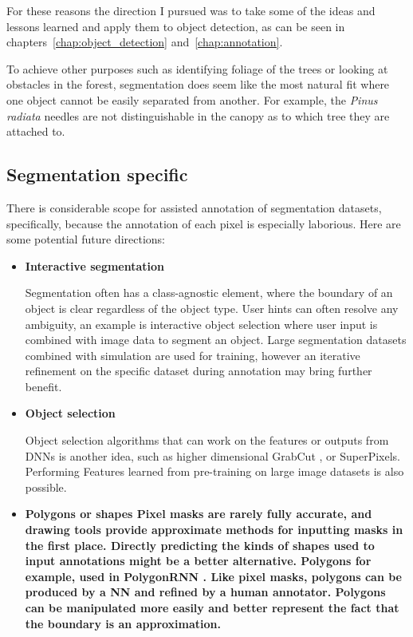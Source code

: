 For these reasons the direction I pursued was to take some of the ideas and lessons learned and apply them to object detection, as can be seen in chapters~\ref {chap:object_detection} and~\ref {chap:annotation}.

To achieve other purposes such as identifying foliage of the trees or looking at obstacles in the forest, segmentation does seem like the most natural fit where one object cannot be easily separated from another. For example, the \emph{Pinus radiata} needles are not distinguishable in the canopy as to which tree they are attached to.

\subsection{Segmentation specific}

There is considerable scope for assisted annotation of segmentation datasets, specifically, because the annotation of each pixel is especially laborious. Here are some potential future directions: 

\begin{itemize}
    
\item \bf {Interactive segmentation} \par
Segmentation often has a class-agnostic element, where the boundary of an object is clear regardless of the object type. User hints can often resolve any ambiguity, an example is interactive object selection \cite{Xu2016, Xu2017} where user input is combined with image data to segment an object. Large segmentation datasets combined with simulation are used for training, however an iterative refinement on the specific dataset during annotation may bring further benefit.

\item \bf {Object selection} \par
Object selection algorithms that can work on the features or outputs from \gls{DNN}s is another idea, such as higher dimensional GrabCut \cite{Xu2016a}, or SuperPixels. Performing Features learned from pre-training on large image datasets is also possible.

\item \bf {Polygons or shapes}
Pixel masks are rarely fully accurate, and drawing tools provide approximate methods for inputting masks in the first place. Directly predicting the kinds of shapes used to input annotations might be a better alternative. Polygons for example, used in PolygonRNN \cite{Castrejon2017}. Like pixel masks, polygons can be produced by a \gls{NN} and refined by a human annotator. Polygons can be manipulated more easily and better represent the fact that the boundary is an approximation.
\end{itemize}

